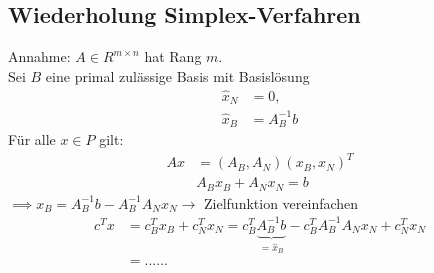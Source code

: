\subsection{Wiederholung Simplex-Verfahren}
Annahme: $A \in R^{m \times n}$ hat Rang $m$.\\
Sei $B$ eine primal zulässige Basis mit Basislösung 
\begin{align*}
	\hat{x}_{N}&=0,\\
	\hat{x}_{B}&= A_{B}^{-1}b
\end{align*} 
Für alle $x \in P$ gilt:
\begin{align*}
	Ax&=(A_{B},A_{N})(x_{B},x_{N})^{T}\\
	  & A_{B}x_{B} + A_{N}x_{N}= b
\end{align*} 
$\implies x_{B} = A_{B}^{-1}b - A_{B}^{-1}A_{N}x_{N} \to$ Zielfunktion vereinfachen
\begin{align*}
	c^Tx&= c_{B}^Tx_{B} + c_{N}^Tx_{N} = c_{B}^T \underbrace{A_{B}^{-1}b}_{= \hat{x}_{B}} - c_{B}^TA_{B}^{-1}A_{N}x_{N} + c_{N}^Tx_{N}\\
	&= ...... %
\end{align*}  %

